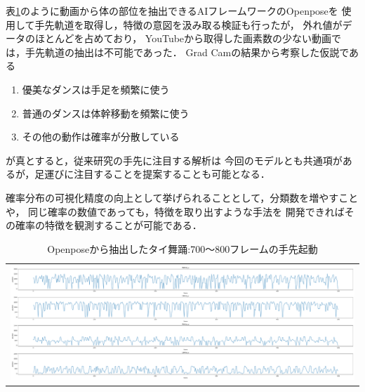 表\ref{json}のように動画から体の部位を抽出できるAIフレームワークのOpenpose\cite{openpose}を
使用して手先軌道を取得し，特徴の意図を汲み取る検証も行ったが，
外れ値がデータのほとんどを占めており，
YouTubeから取得した画素数の少ない動画では，手先軌道の抽出は不可能であった．
Grad Camの結果から考察した仮説である
\begin{enumerate}
  \item 優美なダンスは手足を頻繁に使う
  \item 普通のダンスは体幹移動を頻繁に使う
  \item その他の動作は確率が分散している
\end{enumerate}
が真とすると，従来研究の手先に注目する解析は
今回のモデルとも共通項があるが，足運びに注目することを提案することも可能となる．

確率分布の可視化精度の向上として挙げられることとして，分類数を増やすことや，
同じ確率の数値であっても，特徴を取り出すような手法を
開発できればその確率の特徴を観測することが可能である．

\begin{table}[b]
  \begin{center}
    \begin{tabular}{c}
      \includegraphics[width=130mm]{images/dist/thai_elegant_json.pdf} \\
    \end{tabular}
  \end{center}
  \caption{Openposeから抽出したタイ舞踊:700〜800フレームの手先起動}
  \label{json}
\end{table}
\clearpage